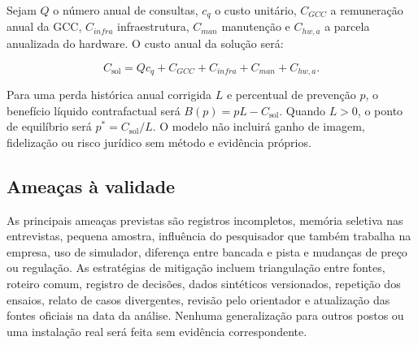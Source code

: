 Sejam $Q$ o número anual de consultas, $c_q$ o custo unitário, $C_{GCC}$ a
remuneração anual da GCC, $C_{infra}$ infraestrutura, $C_{man}$ manutenção e
$C_{hw,a}$ a parcela anualizada do hardware. O custo anual da solução será:

\begin{equation}
  C_{\mathrm{sol}}=Q c_q+C_{GCC}+C_{infra}+C_{man}+C_{hw,a}.
  \label{eq:custo-solucao}
\end{equation}

Para uma perda histórica anual corrigida $L$ e percentual de prevenção $p$, o
benefício líquido contrafactual será $B(p)=pL-C_{\mathrm{sol}}$. Quando $L>0$, o ponto
de equilíbrio será $p^{*}=C_{\mathrm{sol}}/L$. O modelo não incluirá ganho de imagem,
fidelização ou risco jurídico sem método e evidência próprios.

\subsection{Ameaças à validade}

As principais ameaças previstas são registros incompletos, memória seletiva nas
entrevistas, pequena amostra, influência do pesquisador que também trabalha na
empresa, uso de simulador, diferença entre bancada e pista e mudanças de preço
ou regulação. As estratégias de mitigação incluem triangulação entre fontes,
roteiro comum, registro de decisões, dados sintéticos versionados, repetição dos
ensaios, relato de casos divergentes, revisão pelo orientador e atualização das
fontes oficiais na data da análise. Nenhuma generalização para outros postos ou
uma instalação real será feita sem evidência correspondente.
